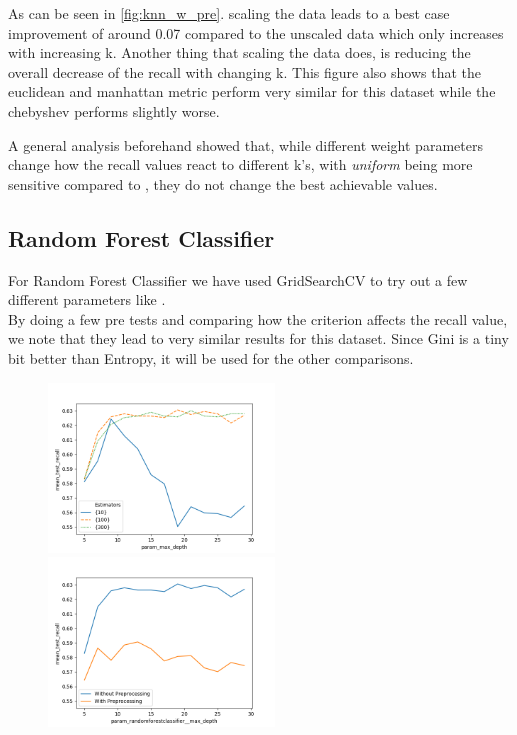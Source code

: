 \documentclass{article}
\newcommand{\secref}[1]{\autoref{#1}. \texit{\nameref{#1}}}
\begin{document}
As can be seen in \secref{fig:knn_w_pre} scaling the data leads to a best case improvement of around 0.07 compared to the unscaled data which only increases with increasing k. Another thing that scaling the data does, is reducing the overall decrease of the recall with changing k. This figure also shows that the euclidean and manhattan metric perform very similar for this dataset while the chebyshev performs slightly worse.


A general analysis beforehand showed that, while different weight parameters change how the recall values react to different k's, with \textit{uniform} being more sensitive compared to , they do not change the best achievable values.

\subsection{Random Forest Classifier}
For Random Forest Classifier we have used GridSearchCV to try out a few different parameters like . \\
\newline
By doing a few pre tests and comparing how the criterion affects the recall value, we note that they lead to very similar results for this dataset. Since Gini is a tiny bit better than Entropy, it will be used for the other comparisons. \\
\newline

\begin{figure}
\begin{floatrow}
    {\includegraphics[width=6cm]{plots/rfc_n_estimators_comparison.png}\label{fig:rf_n_estim}}
    {\includegraphics[width=6cm]{plots/rfc_preprocessing_comparison.png}\label{fig:rfc_pre}}
\end{floatrow}
\end{figure}
\end{document}
